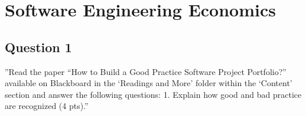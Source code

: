 \chapter{Software Engineering Economics}
\section{Question 1}

''Read the paper “How to Build a Good Practice Software Project Portfolio?” available on Blackboard in
the ‘Readings and More’ folder within the ‘Content’ section and answer the following questions:
1. Explain how good and bad practice are recognized (4 pts).''